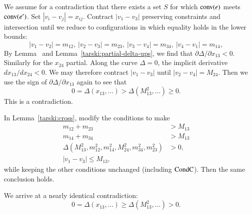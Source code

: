 \begin{tarskidata}
\begin{tarski}

\begin{proved} 
We assume for a contradiction that there exists a set $S$ for
which ${\operatorname{conv}}(e)$ meets ${\operatorname{conv}}(e')$.  Set $|v_i-v_j|=x_{ij}$. Contract $|v_1-v_3|$
preserving constraints and intersection until we
reduce to configurations in which equality
holds in the lower bounds:
	$$|v_1-v_2|=m_{12},\ |v_2-v_3|=m_{23},\ |v_3-v_4|=m_{34},\ 
      |v_4-v_1|=m_{14},$$   
By Lemma~ and Lemma~\ref{tarski:partial-delta-ups}, we find that
$\partial\Delta/\partial x_{13}<0$.   Similarly for the $x_{24}$ partial.
Along the curve $\Delta=0$, the implicit derivative $d x_{13}/d x_{24} <0$.  
We may therefore contract $|v_1-v_3|$ until $|v_2-v_4|=M_{24}$.  Then we use
the sign of $\partial\Delta/\partial x_{13}$ again to see that
   $$0 = \Delta(x_{13},\ldots) > \Delta(M^2_{13},\ldots) \ge 0.$$
This is a contradiction.
\swallowed\end{proved}
\end{tarski}





\begin{tarski}
\tag{segs-meet, conv2, condC}

\begin{lemma}  
In Lemma~\ref{tarski:cross}, modify the conditions to make
    $$
    \begin{array}{lll}
      	m_{12} + m_{23} &> M_{13}\\
	m_{14} + m_{34} &> M_{13}\\
  \Delta(M^2_{13},m^2_{12},m^2_{14},M^2_{24},
		m^2_{34},m^2_{23}) &> 0,\\
                |v_1-v_3|\le M_{13},
      \end{array}
    $$
while keeping the other conditions unchanged (including ${\operatorname{CondC}}$).  Then the same conclusion
holds.
\end{lemma}

\begin{proved}  We arrive at a nearly identical contradiction:
  $$ 0 = \Delta(x_{13},\ldots) \ge \Delta(M^2_{13},\ldots) > 0.$$
\swallowed\end{proved}
\end{tarski}








\end{tarskidata}

